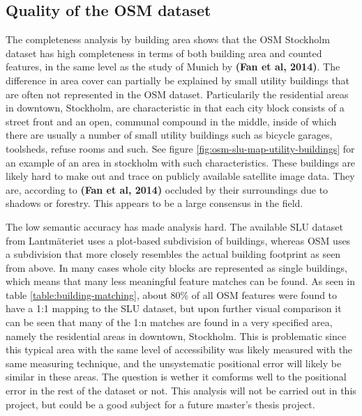 \documentclass{kththesis}
\begin{document}
\subsection{Quality of the OSM dataset}

The completeness analysis by building area shows that the OSM Stockholm dataset has high completeness in terms of both building area and counted features, in the same level as the study of Munich by \textbf{(Fan et al, 2014)}.
The difference in area cover can partially be explained by small utility buildings that are often not represented in the OSM dataset.
Particularily the residential areas in downtown, Stockholm, are characteristic in that each city block consists of a street front and an open, communal compound in the middle, inside of which there are usually a number of small utility buildings such as bicycle garages, toolsheds, refuse rooms and such.
See figure \ref{fig:osm-slu-map-utility-buildings} for an example of an area in stockholm with such characteristics.
These buildings are likely hard to make out and trace on publicly available satellite image data.
They are, according to \textbf{(Fan et al, 2014)} occluded by their surroundings due to shadows or forestry.
This appears to be a large consensus in the field.

The low semantic accuracy has made analysis hard.
The available SLU dataset from Lantmäteriet uses a plot-based subdivision of buildings, whereas OSM uses a subdivision that more closely resembles the actual building footprint as seen from above.
In many cases whole city blocks are represented as single buildings, which means that many less meaningful feature matches can be found.
As seen in table \ref{table:building-matching}, about 80\% of all OSM features were found to have a 1:1 mapping to the SLU dataset, but upon further visual comparison it can be seen that many of the 1:n matches are found in a very specified area, namely the residential areas in downtown, Stockholm.
This is problematic since this typical area with the same level of accessibility was likely measured with the same measuring technique, and the unsystematic positional error will likely be similar in these areas.
The question is wether it comforms well to the positional error in the rest of the dataset or not.
This analysis will not be carried out in this project, but could be a good subject for a future master's thesis project.
\end{document}
